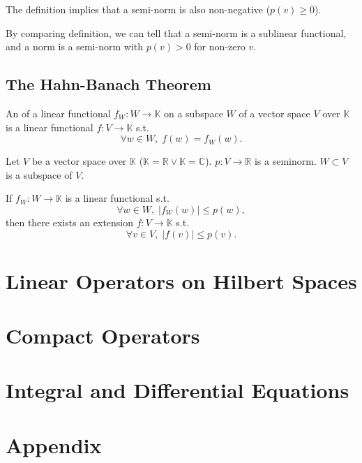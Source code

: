 \documentclass[openany, a5paper]{book}
\begin{document}
The definition implies that a semi-norm is also non-negative ($p(v) \geq 0$).

By comparing definition, we can tell that a semi-norm is a sublinear functional, and a norm is a semi-norm with $p(v) > 0$ for non-zero $v$.

\section{The Hahn-Banach Theorem}

\begin{definition}[Extension]
	An  of a linear functional $f_W\colon W \to \mathbb K$ on a subspace $W$ of a vector space $V$ over $\mathbb K$ is a linear functional $f\colon V \to \mathbb K$ s.t.\ 
	\begin{equation*}
		\forall w \in W, \;
		f(w) = f_W(w).
	\end{equation*}
\end{definition}


\begin{theorem}%
	\label{thm: Hahn-Banach}
	Let $V$ be a vector space over $\mathbb K$ ($\mathbb K = \mathbb R \vee \mathbb K = \mathbb C$).
	$p\colon V \to \mathbb R$ is a seminorm.
	$W \subset V$ is a subspace of $V$.

	If $f_W\colon W \to \mathbb K$ is a linear functional s.t.\ 
	\begin{equation*}
		\forall w \in W, \;
		|f_W(w)| \leq p(w),
	\end{equation*}
	then there exists an extension $f \colon V \to \mathbb K$ s.t.\ 
	\begin{equation*}
		\forall v \in V, \;
		|f(v)| \leq p(v).
	\end{equation*}
\end{theorem}

\chapter{Linear Operators on Hilbert Spaces}

\chapter{Compact Operators}

\chapter{Integral and Differential Equations}

\appendix
\renewcommand{\theequation}{\Alph{chapter}-\arabic{equation}}
\chapter{Appendix}

\backmatter
\nocite{*} %
\printbibliography[heading=bibliography, title={Bibliography}]

\printindex[symbol]

\printindex
\end{document}

